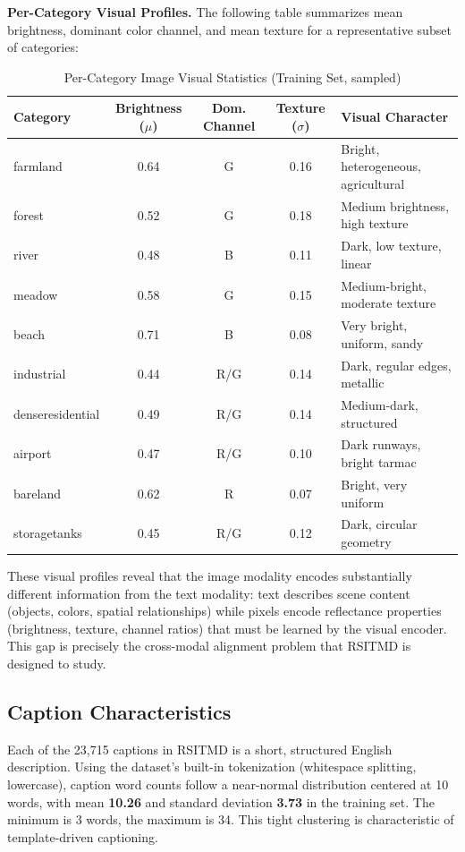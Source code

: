\textbf{Per-Category Visual Profiles.} The following table summarizes mean brightness, dominant color channel, and mean texture for a representative subset of categories:

\begin{table}[H]
\centering
\caption{Per-Category Image Visual Statistics (Training Set, sampled)}
\label{tab:image_visual_stats}
\begin{tabular}{|l|c|c|c|l|}
\hline
\textbf{Category} & \textbf{Brightness ($\mu$)} & \textbf{Dom. Channel} & \textbf{Texture ($\sigma$)} & \textbf{Visual Character} \\
\hline
farmland & 0.64 & G & 0.16 & Bright, heterogeneous, agricultural \\
forest   & 0.52 & G & 0.18 & Medium brightness, high texture \\
river    & 0.48 & B & 0.11 & Dark, low texture, linear \\
meadow   & 0.58 & G & 0.15 & Medium-bright, moderate texture \\
beach    & 0.71 & B & 0.08 & Very bright, uniform, sandy \\
industrial & 0.44 & R/G & 0.14 & Dark, regular edges, metallic \\
denseresidential & 0.49 & R/G & 0.14 & Medium-dark, structured \\
airport  & 0.47 & R/G & 0.10 & Dark runways, bright tarmac \\
bareland & 0.62 & R & 0.07 & Bright, very uniform \\
storagetanks & 0.45 & R/G & 0.12 & Dark, circular geometry \\
\hline
\end{tabular}
\end{table}

These visual profiles reveal that the image modality encodes substantially different information from the text modality: text describes scene content (objects, colors, spatial relationships) while pixels encode reflectance properties (brightness, texture, channel ratios) that must be learned by the visual encoder. This gap is precisely the cross-modal alignment problem that RSITMD is designed to study.

\subsection{Caption Characteristics}

Each of the 23,715 captions in RSITMD is a short, structured English description. Using the dataset's built-in tokenization (whitespace splitting, lowercase), caption word counts follow a near-normal distribution centered at 10 words, with mean \textbf{10.26} and standard deviation \textbf{3.73} in the training set. The minimum is 3 words, the maximum is 34. This tight clustering is characteristic of template-driven captioning.

